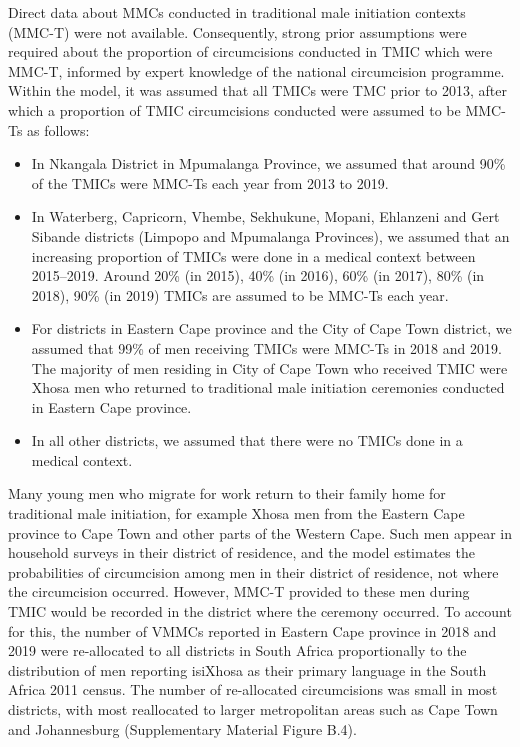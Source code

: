 \documentclass{article}
\begin{document}
Direct data about MMCs conducted in traditional male initiation contexts (MMC-T) were not available. Consequently, strong prior assumptions were required about the proportion of circumcisions conducted in TMIC which were MMC-T, informed by expert knowledge of the national circumcision programme. Within the model, it was assumed that all TMICs were TMC prior to 2013, after which a proportion of TMIC circumcisions conducted were assumed to be MMC-Ts as follows:
\begin{itemize}
\item In Nkangala District in Mpumalanga Province, we assumed that around 90\% of the TMICs were MMC-Ts each year from 2013 to 2019.
\item In Waterberg, Capricorn, Vhembe, Sekhukune, Mopani, Ehlanzeni and Gert Sibande districts (Limpopo and Mpumalanga Provinces), we assumed that an increasing proportion of TMICs were done in a medical context between 2015--2019. Around 20\% (in 2015), 40\% (in 2016), 60\% (in 2017), 80\% (in 2018), 90\% (in 2019) TMICs are assumed to be MMC-Ts each year.
\item For districts in Eastern Cape province and the City of Cape Town district, we assumed that 99\% of men receiving TMICs were MMC-Ts in 2018 and 2019. The majority of men residing in City of Cape Town who received TMIC were Xhosa men who returned to traditional male initiation ceremonies conducted in Eastern Cape province.
\item In all other districts, we assumed that there were no TMICs done in a medical context.
\end{itemize}

Many young men who migrate for work return to their family home for traditional male initiation, for example Xhosa men from the Eastern Cape province to Cape Town and other parts of the Western Cape. Such men appear in household surveys in their district of residence, and the model estimates the probabilities of circumcision among men in their district of residence, not where the circumcision occurred. However, MMC-T provided to these men during TMIC would be recorded in the district where the ceremony occurred. To account for this, the number of VMMCs reported in Eastern Cape province in 2018 and 2019 were re-allocated to all districts in South Africa proportionally to the distribution of men reporting isiXhosa as their primary language in the South Africa 2011 census. The number of re-allocated circumcisions was small in most districts, with most reallocated to larger metropolitan areas such as Cape Town and Johannesburg (Supplementary Material Figure B.4).
\end{document}
